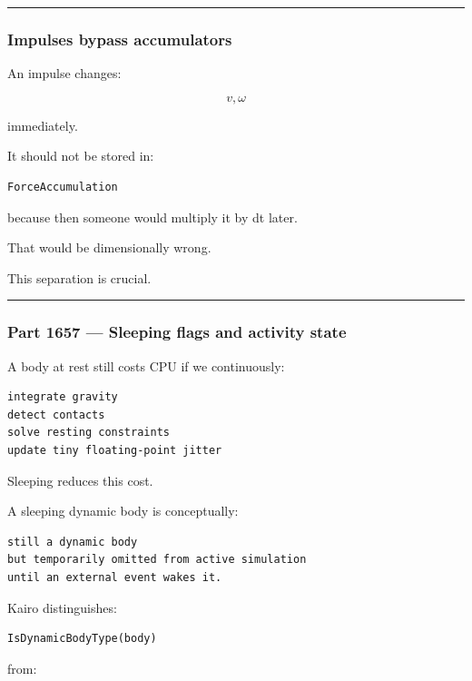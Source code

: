 \begin{center}\rule{0.5\linewidth}{0.5pt}\end{center}

\subsubsection{Impulses bypass accumulators}\label{impulses-bypass-accumulators}

An impulse changes:

\[
v,\omega
\]

immediately.

It should not be stored in:

\begin{verbatim}
ForceAccumulation
\end{verbatim}

because then someone would multiply it by dt later.

That would be dimensionally wrong.

This separation is crucial.

\begin{center}\rule{0.5\linewidth}{0.5pt}\end{center}

\subsubsection{Part 1657 --- Sleeping flags and activity state}\label{part-1657-sleeping-flags-and-activity-state}

A body at rest still costs CPU if we continuously:

\begin{verbatim}
integrate gravity
detect contacts
solve resting constraints
update tiny floating-point jitter
\end{verbatim}

Sleeping reduces this cost.

A sleeping dynamic body is conceptually:

\begin{verbatim}
still a dynamic body
but temporarily omitted from active simulation
until an external event wakes it.
\end{verbatim}

Kairo distinguishes:

\begin{verbatim}
IsDynamicBodyType(body)
\end{verbatim}

from:

